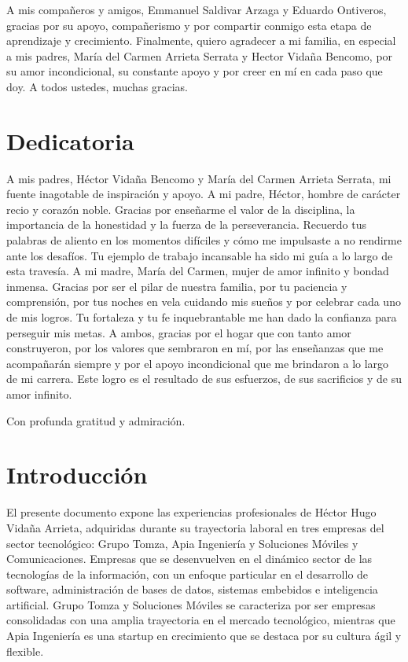 \documentclass[final, fmstyle, 12pt]{article}
\begin{document}
A mis compañeros y amigos, Emmanuel Saldivar Arzaga y Eduardo Ontiveros, gracias por su apoyo, compañerismo y por compartir conmigo esta etapa de aprendizaje y crecimiento.
Finalmente, quiero agradecer a mi familia, en especial a mis padres, María del Carmen Arrieta Serrata y Hector Vidaña Bencomo, por su amor incondicional, su constante apoyo y por creer en mí en cada paso que doy.
A todos ustedes, muchas gracias.


\section{Dedicatoria}
\setlength{\parskip}{1em}
A mis padres, Héctor Vidaña Bencomo y María del Carmen Arrieta Serrata,  mi fuente inagotable de inspiración y apoyo.
A mi padre, Héctor, hombre de carácter recio y corazón noble. Gracias por enseñarme el valor de la disciplina, la importancia de la honestidad y la fuerza de la perseverancia.  Recuerdo tus palabras de aliento en los momentos difíciles y cómo me impulsaste a no rendirme ante los desafíos.  Tu ejemplo de trabajo incansable ha sido mi guía a lo largo de esta travesía.
A mi madre, María del Carmen,  mujer de  amor infinito y  bondad inmensa.  Gracias por ser el pilar de nuestra familia, por tu paciencia y comprensión, por tus noches en vela cuidando mis sueños y por celebrar cada uno de mis logros.  Tu fortaleza y  tu fe inquebrantable me han dado la confianza para perseguir mis metas.
A ambos, gracias por el hogar que con tanto amor construyeron,  por los valores que sembraron en mí, por las enseñanzas que me acompañarán siempre y por el apoyo incondicional que me brindaron a lo largo de mi carrera. Este logro es el resultado de sus esfuerzos,  de sus sacrificios y de su amor infinito.


Con profunda gratitud y admiración.




\section{Introducción}
\setlength{\parskip}{1em} 
El presente documento expone las experiencias profesionales de Héctor Hugo Vidaña Arrieta, 
adquiridas durante su trayectoria laboral en tres empresas del sector tecnológico: 
Grupo Tomza, Apia Ingeniería y Soluciones Móviles y Comunicaciones. 
Empresas que se desenvuelven en el dinámico sector de las tecnologías de la información, 
con un enfoque particular en el desarrollo de software, administración de bases de datos,
sistemas embebidos e inteligencia artificial. Grupo Tomza y Soluciones Móviles se caracteriza por ser empresas consolidadas con una amplia trayectoria en el mercado tecnológico, mientras que Apia Ingeniería es una startup en crecimiento que se destaca por su cultura ágil y flexible.
\end{document}

